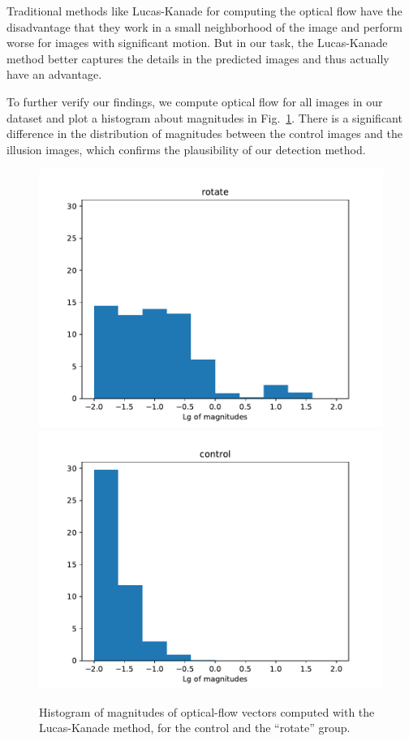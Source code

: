 \documentclass[journal]{IEEEtran}
\begin{document}
  Traditional methods like Lucas-Kanade for computing the optical flow have the disadvantage that they work in a small neighborhood of the image and perform worse for images with significant motion. But in our task, the Lucas-Kanade method better captures the details in the predicted images and thus actually have an advantage.
  
  To further verify our findings, we compute optical flow for all images in our dataset and plot a histogram about magnitudes in Fig.~\ref{fig:histogram-of-magnitudes}. There is a significant difference in the distribution of magnitudes between the control images and the illusion images, which confirms the plausibility of our detection method.
  
  \begin{figure}[t]
    \centering
    \includegraphics[width=\linewidth]{fig/flow-mag-plot-rotate.pdf}
    \includegraphics[width=\linewidth]{fig/flow-mag-plot-control.pdf}
    \caption{Histogram of magnitudes of optical-flow vectors computed with the Lucas-Kanade method, for the control and the ``rotate'' group.}
    \label{fig:histogram-of-magnitudes}
  \end{figure}
  
\end{document}
